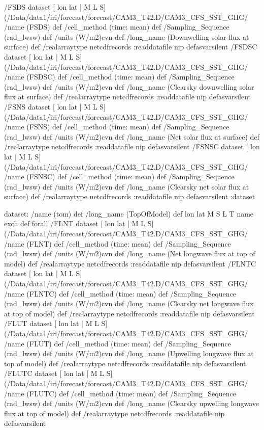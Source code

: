 \begin{ingrid}
 /FSDS{
dataset
[ lon lat | M L S] (/Data/data1/iri/forecast/forecast/CAM3_T42.D/CAM3_CFS_SST_GHG/%
/name (FSDS) def
 /cell_method (time: mean) def
 /Sampling_Sequence (rad_lwsw) def
 /units (W/m2)cvn def
 /long_name (Downwelling solar flux at surface) def
 /realarraytype netcdfrecords :readdatafile
nip
}defasvarsilent
 /FSDSC{
dataset
[ lon lat | M L S] (/Data/data1/iri/forecast/forecast/CAM3_T42.D/CAM3_CFS_SST_GHG/%
/name (FSDSC) def
 /cell_method (time: mean) def
 /Sampling_Sequence (rad_lwsw) def
 /units (W/m2)cvn def
 /long_name (Clearsky downwelling solar flux at surface) def
 /realarraytype netcdfrecords :readdatafile
nip
}defasvarsilent
 /FSNS{
dataset
[ lon lat | M L S] (/Data/data1/iri/forecast/forecast/CAM3_T42.D/CAM3_CFS_SST_GHG/%
/name (FSNS) def
 /cell_method (time: mean) def
 /Sampling_Sequence (rad_lwsw) def
 /units (W/m2)cvn def
 /long_name (Net solar flux at surface) def
 /realarraytype netcdfrecords :readdatafile
nip
}defasvarsilent
 /FSNSC{
dataset
[ lon lat | M L S] (/Data/data1/iri/forecast/forecast/CAM3_T42.D/CAM3_CFS_SST_GHG/%
/name (FSNSC) def
 /cell_method (time: mean) def
 /Sampling_Sequence (rad_lwsw) def
 /units (W/m2)cvn def
 /long_name (Clearsky net solar flux at surface) def
 /realarraytype netcdfrecords :readdatafile
nip
}defasvarsilent
:dataset

dataset:
/name (tom) def
/long_name (TopOfModel) def
{ lon lat M S L T } { name exch def} forall
 /FLNT{
dataset
[ lon lat | M L S] (/Data/data1/iri/forecast/forecast/CAM3_T42.D/CAM3_CFS_SST_GHG/%
/name (FLNT) def
 /cell_method (time: mean) def
 /Sampling_Sequence (rad_lwsw) def
 /units (W/m2)cvn def
 /long_name (Net longwave flux at top of model) def
 /realarraytype netcdfrecords :readdatafile
nip
}defasvarsilent
 /FLNTC{
dataset
[ lon lat | M L S] (/Data/data1/iri/forecast/forecast/CAM3_T42.D/CAM3_CFS_SST_GHG/%
/name (FLNTC) def
 /cell_method (time: mean) def
 /Sampling_Sequence (rad_lwsw) def
 /units (W/m2)cvn def
 /long_name (Clearsky net longwave flux at top of model) def
 /realarraytype netcdfrecords :readdatafile
nip
}defasvarsilent
 /FLUT{
dataset
[ lon lat | M L S] (/Data/data1/iri/forecast/forecast/CAM3_T42.D/CAM3_CFS_SST_GHG/%
/name (FLUT) def
 /cell_method (time: mean) def
 /Sampling_Sequence (rad_lwsw) def
 /units (W/m2)cvn def
 /long_name (Upwelling longwave flux at top of model) def
 /realarraytype netcdfrecords :readdatafile
nip
}defasvarsilent
 /FLUTC{
dataset
[ lon lat | M L S] (/Data/data1/iri/forecast/forecast/CAM3_T42.D/CAM3_CFS_SST_GHG/%
/name (FLUTC) def
 /cell_method (time: mean) def
 /Sampling_Sequence (rad_lwsw) def
 /units (W/m2)cvn def
 /long_name (Clearsky upwelling longwave flux at top of model) def
 /realarraytype netcdfrecords :readdatafile
nip
}defasvarsilent



\end{ingrid}
